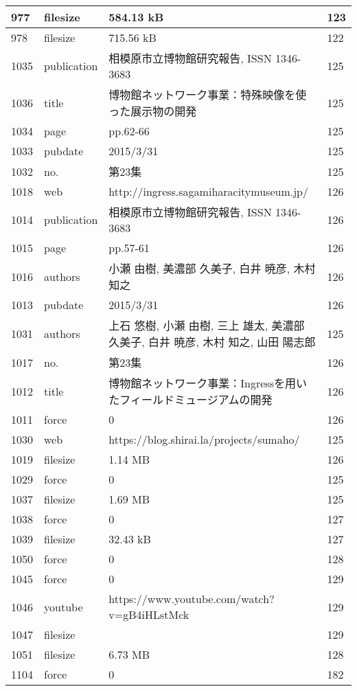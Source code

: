 \begin{longtable}{|l|l|l|l|}
977 & filesize & 584.13 kB & 123 \\ \hline 
978 & filesize & 715.56 kB & 122 \\ \hline 
1035 & publication & 相模原市立博物館研究報告, ISSN 1346-3683 & 125 \\ \hline 
1036 & title & 博物館ネットワーク事業：特殊映像を使った展示物の開発 & 125 \\ \hline 
1034 & page & pp.62-66 & 125 \\ \hline 
1033 & pubdate & 2015/3/31 & 125 \\ \hline 
1032 & no. & 第23集 & 125 \\ \hline 
1018 & web & http://ingress.sagamiharacitymuseum.jp/ & 126 \\ \hline 
1014 & publication & 相模原市立博物館研究報告, ISSN 1346-3683 & 126 \\ \hline 
1015 & page & pp.57-61 & 126 \\ \hline 
1016 & authors & 小瀬 由樹, 美濃部 久美子, 白井 暁彦, 木村 知之 & 126 \\ \hline 
1013 & pubdate & 2015/3/31 & 126 \\ \hline 
1031 & authors & 上石 悠樹, 小瀬 由樹, 三上 雄太, 美濃部 久美子, 白井 暁彦, 木村 知之, 山田 陽志郎 & 125 \\ \hline 
1017 & no. & 第23集 & 126 \\ \hline 
1012 & title & 博物館ネットワーク事業：Ingressを用いたフィールドミュージアムの開発 & 126 \\ \hline 
1011 & force & 0 & 126 \\ \hline 
1030 & web & https://blog.shirai.la/projects/sumaho/ & 125 \\ \hline 
1019 & filesize & 1.14 MB & 126 \\ \hline 
1029 & force & 0 & 125 \\ \hline 
1037 & filesize & 1.69 MB & 125 \\ \hline 
1038 & force & 0 & 127 \\ \hline 
1039 & filesize & 32.43 kB & 127 \\ \hline 
1050 & force & 0 & 128 \\ \hline 
1045 & force & 0 & 129 \\ \hline 
1046 & youtube & https://www.youtube.com/watch?v=gB4iHLstMck & 129 \\ \hline 
1047 & filesize &  & 129 \\ \hline 
1051 & filesize & 6.73 MB & 128 \\ \hline 
1104 & force & 0 & 182 \\ \hline 

\end{longtable}
